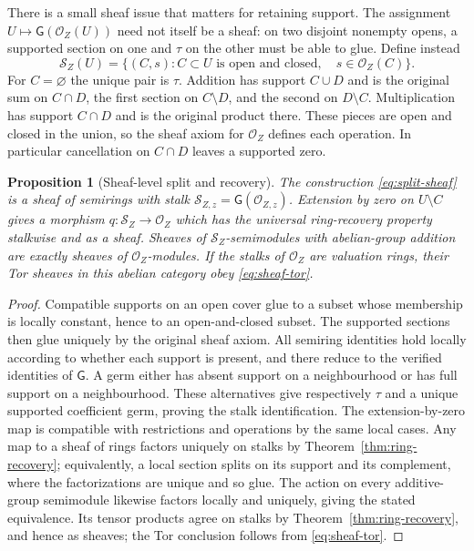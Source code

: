 \documentclass[11pt,a4paper]{article}
\newtheorem{proposition}[theorem]{Proposition}
\theoremstyle{definition}\newtheorem{definition}[theorem]{Definition}
\newcommand{\G}{\mathsf G}\newcommand{\Tor}{\operatorname{Tor}}\newcommand{\Frac}{\operatorname{Frac}}
\begin{document}
There is a small sheaf issue that matters for retaining support.
The assignment $U\mapsto\G(\mathcal O_Z(U))$ need not itself be a sheaf:
on two disjoint nonempty opens, a supported section on one and $\tau$ on
the other must be able to glue. Define instead
\[
 \mathcal S_Z(U)=\{(C,s):C\subset U\text{ is open and closed},\quad
                         s\in\mathcal O_Z(C)\}.
 \tag{AV6.3}\label{eq:split-sheaf}
\]
For $C=\varnothing$ the unique pair is $\tau$. Addition has support
$C\cup D$ and is the original sum on $C\cap D$, the first section on
$C\setminus D$, and the second on $D\setminus C$. Multiplication has
support $C\cap D$ and is the original product there. These pieces are
open and closed in the union, so the sheaf axiom for $\mathcal O_Z$
defines each operation. In particular cancellation on $C\cap D$ leaves
a supported zero.

\begin{proposition}[Sheaf-level split and recovery]
\label{prop:sheafsplit}
The construction \eqref{eq:split-sheaf} is a sheaf of semirings with
stalk $\mathcal S_{Z,z}=\G(\mathcal O_{Z,z})$. Extension by zero on
$U\setminus C$ gives a morphism $q:\mathcal S_Z\to\mathcal O_Z$ which
has the universal ring-recovery property stalkwise and as a sheaf.
Sheaves of $\mathcal S_Z$-semimodules with abelian-group addition are
exactly sheaves of $\mathcal O_Z$-modules. If the stalks of
$\mathcal O_Z$ are valuation rings, their Tor sheaves in this abelian
category obey \eqref{eq:sheaf-tor}.
\end{proposition}
\begin{proof}
Compatible supports on an open cover glue to a subset whose membership
is locally constant, hence to an open-and-closed subset. The supported
sections then glue uniquely by the original sheaf axiom. All semiring
identities hold locally according to whether each support is present,
and there reduce to the verified identities of $\G$.
A germ either has absent support on a neighbourhood or has full support
on a neighbourhood. These alternatives give respectively $\tau$ and
a unique supported coefficient germ, proving the stalk identification.
The extension-by-zero map is compatible with restrictions and
operations by the same local cases. Any map to a sheaf of rings factors
uniquely on stalks by Theorem~\ref{thm:ring-recovery}; equivalently, a
local section splits on its support and its complement, where the
factorizations are unique and so glue. The action on every additive-group
semimodule likewise factors locally and uniquely, giving the stated
equivalence. Its tensor products agree on stalks by
Theorem~\ref{thm:ring-recovery}, and hence as sheaves; the Tor conclusion
follows from \eqref{eq:sheaf-tor}.
\end{proof}
\end{document}
